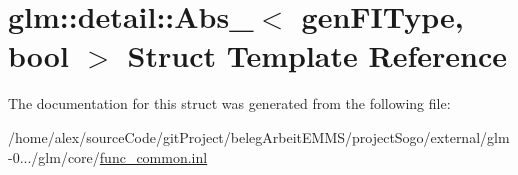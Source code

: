 \hypertarget{structglm_1_1detail_1_1Abs__}{\section{glm\-:\-:detail\-:\-:Abs\-\_\-$<$ gen\-F\-I\-Type, bool $>$ Struct Template Reference}
\label{structglm_1_1detail_1_1Abs__}
}


The documentation for this struct was generated from the following file\-:\begin{DoxyCompactItemize}
\item 
/home/alex/source\-Code/git\-Project/beleg\-Arbeit\-E\-M\-M\-S/project\-Sogo/external/glm-\/0.../glm/core/\hyperlink{func__common_8inl}{func\-\_\-common.\-inl}\end{DoxyCompactItemize}
